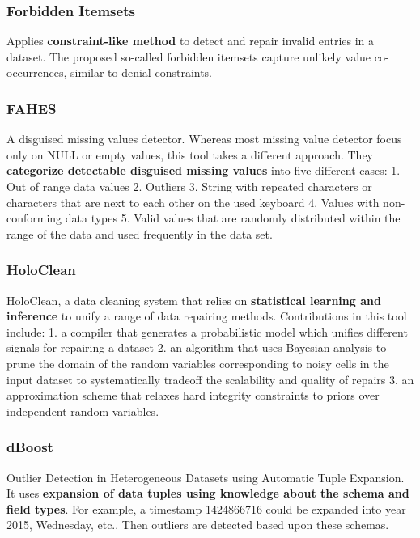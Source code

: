 \subsubsection{Forbidden Itemsets \cite{Rammelaere2019-ea}}
Applies \textbf{constraint-like method} to detect and repair invalid entries in a dataset. The proposed so-called forbidden itemsets capture unlikely value co-occurrences, similar to denial constraints.

\subsubsection{FAHES \cite{Qahtan2018-te}}
A disguised missing values detector. Whereas most missing value detector focus only on NULL or empty values, this tool takes a different approach. They \textbf{categorize detectable disguised missing values} into five different cases: 1. Out of range data values 2. Outliers 3. String with repeated characters or characters that are next to each other on the used keyboard 4. Values with non-conforming data types 5. Valid values that are randomly distributed within the range of the data and used frequently in the data set.

\subsubsection{HoloClean \cite{Rekatsinas2017-iw}}
HoloClean, a data cleaning system that relies on \textbf{statistical learning and inference} to unify a range of data repairing methods. Contributions in this tool include: 1. a compiler that generates a probabilistic model which unifies different signals for repairing a dataset 2. an algorithm that uses Bayesian analysis to prune the domain of the random variables corresponding to noisy cells in the input dataset to systematically tradeoff the scalability and quality of repairs 3. an approximation scheme that relaxes hard integrity constraints to priors over independent random variables.

\subsubsection{dBoost \cite{Pit--Claudel2016-dj}}
Outlier Detection in Heterogeneous Datasets using Automatic Tuple Expansion. It uses \textbf{expansion of data tuples using knowledge about the schema and field types}. For example, a timestamp 1424866716 could be expanded into year 2015, Wednesday, etc.. Then outliers are detected based upon these schemas.

